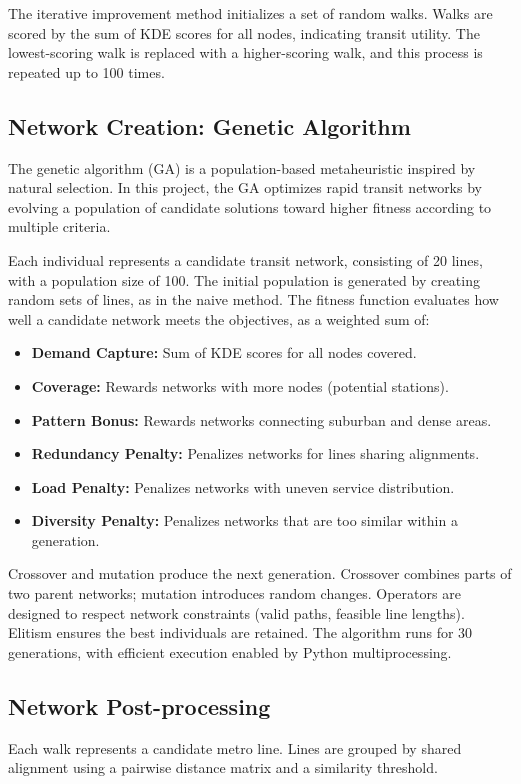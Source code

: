 \documentclass[manuscript,nonacm]{acmart}
\begin{document}
The iterative improvement method initializes a set of random walks. Walks are scored by the sum of KDE scores for all nodes, indicating transit utility. The lowest-scoring walk is replaced with a higher-scoring walk, and this process is repeated up to 100 times.

\subsection{Network Creation: Genetic Algorithm}
The genetic algorithm (GA) is a population-based metaheuristic inspired by natural selection. In this project, the GA optimizes rapid transit networks by evolving a population of candidate solutions toward higher fitness according to multiple criteria.

Each individual represents a candidate transit network, consisting of 20 lines, with a population size of 100. The initial population is generated by creating random sets of lines, as in the naive method. The fitness function evaluates how well a candidate network meets the objectives, as a weighted sum of:
\begin{itemize}
    \item \textbf{Demand Capture:} Sum of KDE scores for all nodes covered.
    \item \textbf{Coverage:} Rewards networks with more nodes (potential stations).
    \item \textbf{Pattern Bonus:} Rewards networks connecting suburban and dense areas.
    \item \textbf{Redundancy Penalty:} Penalizes networks for lines sharing alignments.
    \item \textbf{Load Penalty:} Penalizes networks with uneven service distribution.
    \item \textbf{Diversity Penalty:} Penalizes networks that are too similar within a generation.
\end{itemize}

Crossover and mutation produce the next generation. Crossover combines parts of two parent networks; mutation introduces random changes. Operators are designed to respect network constraints (valid paths, feasible line lengths). Elitism ensures the best individuals are retained. The algorithm runs for 30 generations, with efficient execution enabled by Python multiprocessing.

\subsection{Network Post-processing}
Each walk represents a candidate metro line. Lines are grouped by shared alignment using a pairwise distance matrix and a similarity threshold.
\end{document}
